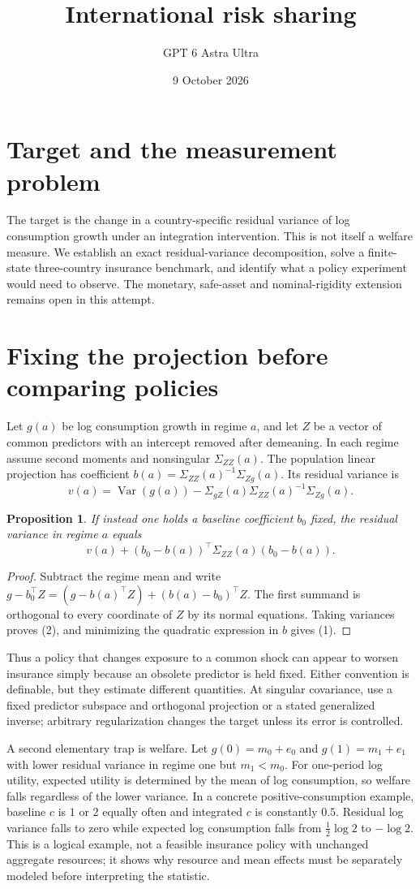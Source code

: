 \documentclass[11pt]{article}
\title{International risk sharing}
\author{GPT 6 Astra Ultra}
\date{9 October 2026}
\newtheorem{proposition}[theorem]{Proposition}
\theoremstyle{definition}
\begin{document}
\maketitle
\section*{Target and the measurement problem}
The target is the change in a country-specific residual variance of log
consumption growth under an integration intervention. This is not itself a
welfare measure. We establish an exact residual-variance decomposition, solve
a finite-state three-country insurance benchmark, and identify what a policy
experiment would need to observe. The monetary, safe-asset and nominal-rigidity
extension remains open in this attempt.

\section*{Fixing the projection before comparing policies}
Let $g(a)$ be log consumption growth in regime $a$, and let $Z$ be a vector
of common predictors with an intercept removed after demeaning. In each regime
assume second moments and nonsingular $\Sigma_{ZZ}(a)$. The population linear
projection has coefficient $b(a)=\Sigma_{ZZ}(a)^{-1}\Sigma_{Zg}(a)$.
Its residual variance is
\[
 v(a)=\operatorname{Var}(g(a))-
 \Sigma_{gZ}(a)\Sigma_{ZZ}(a)^{-1}\Sigma_{Zg}(a).           \tag{1}
\]
\begin{proposition}
If instead one holds a baseline coefficient $b_0$ fixed, the residual variance
in regime $a$ equals
\[
 v(a)+(b_0-b(a))^{\top}\Sigma_{ZZ}(a)(b_0-b(a)).      \tag{2}
\]
\end{proposition}
\begin{proof}
Subtract the regime mean and write
$g-b_0^{\top}Z=(g-b(a)^{\top}Z)+(b(a)-b_0)^{\top}Z$.
The first summand is orthogonal to every coordinate of $Z$ by its normal
equations. Taking variances proves (2), and minimizing the quadratic expression
in $b$ gives (1).
\end{proof}
Thus a policy that changes exposure to a common shock can appear to worsen
insurance simply because an obsolete predictor is held fixed. Either convention
is definable, but they estimate different quantities. At singular covariance,
use a fixed predictor subspace and orthogonal projection or a stated generalized
inverse; arbitrary regularization changes the target unless its error is controlled.

A second elementary trap is welfare. Let $g(0)=m_0+e_0$ and
$g(1)=m_1+e_1$ with lower residual variance in regime one but $m_1<m_0$.
For one-period log utility, expected utility is determined by the mean of log
consumption, so welfare falls regardless of the lower variance. In a concrete
positive-consumption example, baseline $c$ is $1$ or $2$ equally often and
integrated $c$ is constantly $0.5$. Residual log variance falls to zero while
expected log consumption falls from $\tfrac12\log2$ to $-\log2$.
This is a logical example, not a feasible insurance policy with unchanged
aggregate resources; it shows why resource and mean effects must be separately
modeled before interpreting the statistic.
\end{document}
